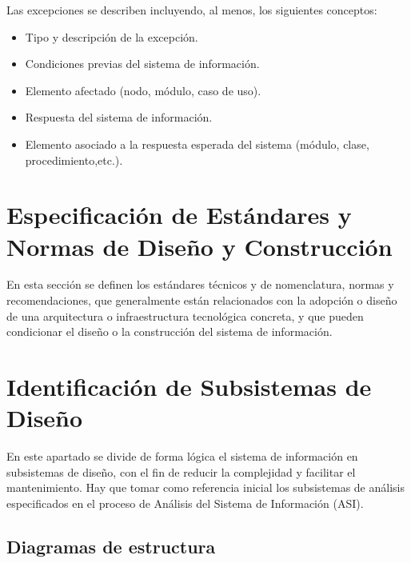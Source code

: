 Las excepciones se describen incluyendo, al menos, los siguientes conceptos:\\

\begin{itemize}
    \item Tipo y descripción de la excepción.
    \item Condiciones previas del sistema de información.
    \item Elemento afectado (nodo, módulo, caso de uso).
    \item Respuesta del sistema de información.
    \item Elemento asociado a la respuesta esperada del sistema (módulo, clase, procedimiento,etc.).
\end{itemize}


\section{Especificación de Estándares y Normas de
Diseño y Construcción}
\noindent En esta sección se definen los estándares técnicos y de nomenclatura, normas y
recomendaciones, que generalmente están relacionados con la adopción o diseño de una arquitectura o infraestructura tecnológica concreta, y que pueden condicionar el diseño o la construcción del sistema de información.

\section{Identificación de Subsistemas de Diseño}
\noindent En este apartado se divide de forma lógica el sistema de información en subsistemas de
diseño, con el fin de reducir la complejidad y facilitar el mantenimiento. Hay que tomar como
referencia inicial los subsistemas de análisis especificados en el proceso de Análisis del
Sistema de Información (ASI).
\subsection{Diagramas de estructura}

